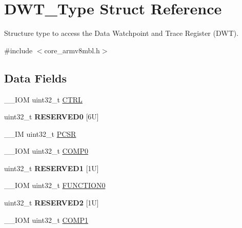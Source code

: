 \hypertarget{struct_d_w_t___type}{}\section{D\+W\+T\+\_\+\+Type Struct Reference}
\label{struct_d_w_t___type}


Structure type to access the Data Watchpoint and Trace Register (D\+WT).  




{\ttfamily \#include $<$core\+\_\+armv8mbl.\+h$>$}

\subsection*{Data Fields}
\begin{DoxyCompactItemize}
\item 
\+\_\+\+\_\+\+I\+OM uint32\+\_\+t \hyperlink{struct_d_w_t___type_add790c53410023b3b581919bb681fe2a}{C\+T\+RL}
\item 
\mbox{\label{struct_d_w_t___type_a383c3272908da383b6e23a059007f728}} 
uint32\+\_\+t {\bfseries R\+E\+S\+E\+R\+V\+E\+D0} \mbox{[}6\+U\mbox{]}
\item 
\+\_\+\+\_\+\+IM uint32\+\_\+t \hyperlink{struct_d_w_t___type_a6353ca1d1ad9bc1be05d3b5632960113}{P\+C\+SR}
\item 
\+\_\+\+\_\+\+I\+OM uint32\+\_\+t \hyperlink{struct_d_w_t___type_a61c2965af5bc0643f9af65620b0e67c9}{C\+O\+M\+P0}
\item 
\mbox{\label{struct_d_w_t___type_af4ad5239d7d9b1990005f75464754594}} 
uint32\+\_\+t {\bfseries R\+E\+S\+E\+R\+V\+E\+D1} \mbox{[}1\+U\mbox{]}
\item 
\+\_\+\+\_\+\+I\+OM uint32\+\_\+t \hyperlink{struct_d_w_t___type_a579ae082f58a0317b7ef029b20f52889}{F\+U\+N\+C\+T\+I\+O\+N0}
\item 
\mbox{\label{struct_d_w_t___type_a61fdbdfbc267bb6ae3b5cff18f406f2f}} 
uint32\+\_\+t {\bfseries R\+E\+S\+E\+R\+V\+E\+D2} \mbox{[}1\+U\mbox{]}
\item 
\+\_\+\+\_\+\+I\+OM uint32\+\_\+t \hyperlink{struct_d_w_t___type_a38714af6b7fa7c64d68f5e1efbe7a931}{C\+O\+M\+P1}
\item 
\mbox{\label{struct_d_w_t___type_a7d29e03e23883440d96cac784c5a4958}} 

\end{DoxyCompactItemize}
